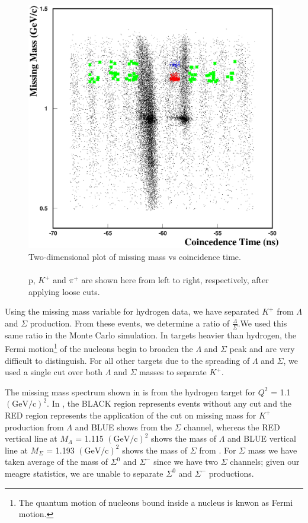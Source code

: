 \begin{figure}[!tbp]
  \centering
  \includegraphics[trim = 3mm 3mm 3mm 3mm,clip,width=0.8\columnwidth]{misscoin}
  \caption[Two-dimensional plot of missing mass vs coincidence time.]{\label{fig:misscoin}Two-dimensional plot of missing mass vs coincidence time.\\\\ p, $K^+$ and $\pi^+$ are shown here from left to right, respectively, after applying loose cuts.}
\end{figure}

Using the missing mass variable for hydrogen data, we have separated $K^+$ from $\Lambda$ and $\Sigma$ production. From these events, we determine a ratio of $\frac{\Lambda}{\Sigma}$.We used this same ratio in the Monte Carlo simulation. In targets heavier than hydrogen, the Fermi motion\footnote{The quantum motion of nucleons bound inside a nucleus is knwon as Fermi motion.} of the nucleons begin to broaden the $\Lambda$ and $\Sigma$ peak and are very difficult to distinguish. For all other targets due to the spreading of $\Lambda$ and $\Sigma$, we used a single cut over both $\Lambda$ and $\Sigma$ masses to separate $K^+$.

The missing mass spectrum shown in  is from the hydrogen target for $Q^2$ = 1.1 $(\mathrm{GeV/c})^2$. In , the BLACK region represents events without any cut and the RED region represents the application of the cut on missing mass for $K^+$ production from $\Lambda$ and BLUE shows from the $\Sigma$ channel, whereas the RED vertical line at $M_\Lambda$ = 1.115 $(\mathrm{GeV/c})^2$ shows the mass of $\Lambda$ and BLUE vertical line at $M_\Sigma$ = 1.193 $(\mathrm{GeV/c})^2$ shows the mass of $\Sigma$ from \cite{PDG}. For $\Sigma$ mass we have taken average of the mass of $\Sigma^0$ and $\Sigma^-$ since we have two $\Sigma$ channels; given our meagre statistics, we are unable to separate $\Sigma^0$ and $\Sigma^-$ productions.

